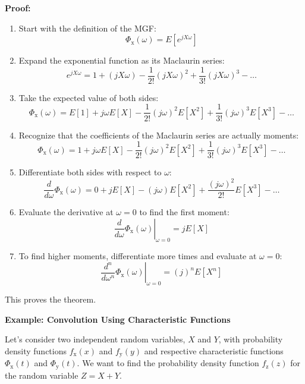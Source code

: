 \documentclass[12pt]{book}
\theoremstyle{definition}
\begin{document}
\textbf{Proof:}
\begin{enumerate}
    \item Start with the definition of the MGF:
    \[
    \Phi_\mathrm{x}(\omega) = E[e^{jX\omega}]
    \]
    
    \item Expand the exponential function as its Maclaurin series:
    \[
    e^{jX\omega} = 1 + (jX\omega) - \frac{1}{2!}(jX\omega)^2 + \frac{1}{3!}(jX\omega)^3 - \ldots
    \]
    
    \item Take the expected value of both sides:
    \[
    \Phi_\mathrm{x}(\omega) = E[1] + j\omega E[X] - \frac{1}{2!}(j\omega)^2 E[X^2] + \frac{1}{3!}(j\omega)^3 E[X^3] - \ldots
    \]
    
    \item Recognize that the coefficients of the Maclaurin series are actually moments:
    \[
    \Phi_\mathrm{x}(\omega) = 1 + j\omega E[X] - \frac{1}{2!}(j\omega)^2 E[X^2] + \frac{1}{3!}(j\omega)^3 E[X^3] - \ldots
    \]
    
    \item Differentiate both sides with respect to $\omega$:
    \[
    \frac{d}{d\omega}\Phi_\mathrm{x}(\omega) = 0 + jE[X] - (j\omega)E[X^2] + \frac{(j\omega)^2}{2!}E[X^3] - \ldots
    \]
    
    \item Evaluate the derivative at $\omega=0$ to find the first moment:
    \[
    \left. \frac{d}{d\omega}\Phi_\mathrm{x}(\omega) \right|_{\omega=0} = jE[X]
    \]
    
    \item To find higher moments, differentiate more times and evaluate at $\omega=0$:
    \[
    \left. \frac{d^n}{d\omega^n}\Phi_\mathrm{x}(\omega) \right|_{\omega=0} = (j)^n E[X^n]
    \]
    
\end{enumerate}

This proves the theorem.

\bigskip
\textbf{Example: Convolution Using Characteristic Functions}

Let's consider two independent random variables, \(X\) and \(Y\), with probability density functions \(f_\mathrm{x}(x)\) and \(f_\mathrm{y}(y)\) and respective characteristic functions \(\Phi_\mathrm{x}(t)\) and \(\Phi_\mathrm{y}(t)\). We want to find the probability density function \(f_\mathrm{z}(z)\) for the random variable \(Z = X + Y\).\\
\end{document}
